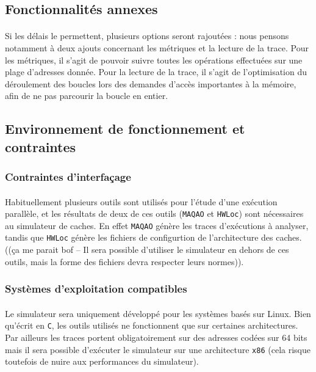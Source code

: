 \subsection{Fonctionnalités annexes}

\paragraph{}
Si les délais le permettent, plusieurs options seront rajoutées : nous pensons notamment à deux ajouts concernant les métriques et la lecture de la trace. Pour les métriques, il s'agit de pouvoir suivre toutes les opérations effectuées sur une plage d'adresses donnée. Pour la lecture de la trace, il s'agit de l'optimisation du déroulement des boucles lors des demandes d'accès importantes à la mémoire, afin de ne pas parcourir la boucle en entier.

\subsection{Environnement de fonctionnement et contraintes}

\subsubsection{Contraintes d'interfaçage}
\paragraph{}
Habituellement plusieurs outils sont utilisés pour l'étude d'une exécution parallèle, et les résultats de deux de ces outils (\texttt{MAQAO} et \texttt{HWLoc}) sont nécessaires au simulateur de caches. En effet \texttt{MAQAO} génère les traces d'exécutions à analyser, tandis que \texttt{HWLoc}
génère les fichiers de configurtion de l'architecture des caches. ((ça me parait bof -- Il sera possible d'utiliser le simulateur en dehors de ces outils, mais la forme des fichiers devra respecter leurs normes)). 

\subsubsection{Systèmes d'exploitation compatibles}
\paragraph{}
Le simulateur sera uniquement développé pour les systèmes basés sur Linux. Bien qu'écrit en \texttt{C}, les outils utilisés ne fonctionnent que sur certaines architectures. Par ailleurs les traces portent obligatoirement sur des adresses codées sur 64 bits mais il sera possible d'exécuter le simulateur sur une architecture \verb!x86! (cela risque toutefois de nuire aux performances du simulateur).

